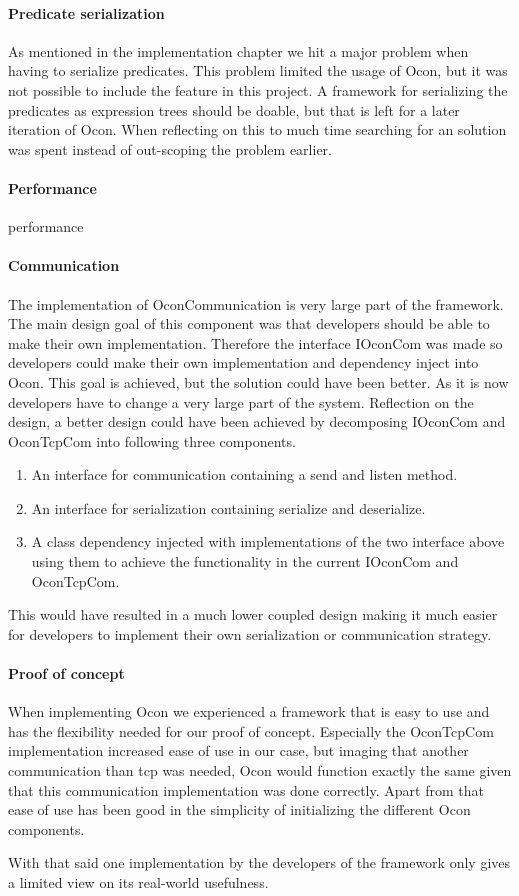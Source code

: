\documentclass[../report.tex]{subfiles}
\begin{document}
\graphicspath{{img/}{../img/}}


\paragraph{Predicate serialization}
As mentioned in the implementation chapter we hit a major problem when having to serialize predicates. This problem limited the usage of Ocon, but it was not possible to include the feature in this project. A framework for serializing the predicates as expression trees should be doable, but that is left for a later iteration of Ocon. When reflecting on this to much time searching for an solution was spent instead of out-scoping the problem earlier. 

\paragraph{Performance}
performance


\paragraph{Communication}
The implementation of OconCommunication is very large part of the framework. The main design goal of this component was that developers should be able to make their own implementation. Therefore the interface IOconCom was made so developers could make their own implementation and dependency inject into Ocon. This goal is achieved, but the solution could have been better. As it is now developers have to change a very large part of the system. Reflection on the design, a better design could have been achieved by decomposing IOconCom and OconTcpCom into following three components.

\begin{enumerate}
\item An interface for communication containing a send and listen method.
\item An interface for serialization containing serialize and deserialize.
\item A class dependency injected with implementations of the two interface above using them to achieve the functionality in the current IOconCom and OconTcpCom.
\end{enumerate}

This would have resulted in a much lower coupled design making it much easier for developers to implement their own serialization or communication strategy.

\paragraph{Proof of concept}
When implementing Ocon we experienced a framework that is easy to use and has the flexibility needed for our proof of concept. Especially the OconTcpCom implementation increased ease of use in our case, but imaging that another communication than tcp was needed, Ocon would function exactly the same given that this communication implementation was done correctly. Apart from that ease of use has been good in the simplicity of initializing the different Ocon components.

With that said one implementation by the developers of the framework only gives a limited view on its real-world usefulness.
\end{document}
